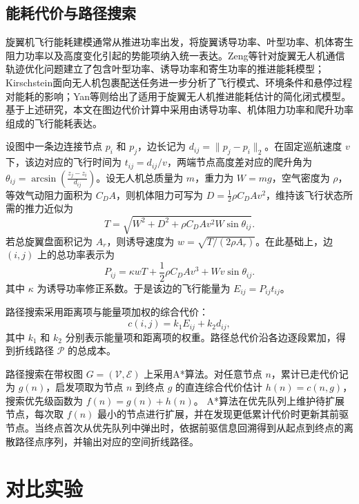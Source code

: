 \subsection{能耗代价与路径搜索}

旋翼机飞行能耗建模通常从推进功率出发，将旋翼诱导功率、叶型功率、机体寄生阻力功率以及高度变化引起的势能项纳入统一表达。Zeng等针对旋翼无人机通信轨迹优化问题建立了包含叶型功率、诱导功率和寄生功率的推进能耗模型\cite{zeng2019energy}；Kirschstein面向无人机包裹配送任务进一步分析了飞行模式、环境条件和悬停过程对能耗的影响\cite{kirschstein2020comparison}；Yan等则给出了适用于旋翼无人机推进能耗估计的简化闭式模型\cite{yan2021new}。基于上述研究，本文在图边代价计算中采用由诱导功率、机体阻力功率和爬升功率组成的飞行能耗表达。

设图中一条边连接节点 \(p_i\) 和 \(p_j\)，边长记为 \(d_{ij}=\|p_j-p_i\|_2\)。在固定巡航速度 \(v\) 下，该边对应的飞行时间为 \(t_{ij}=d_{ij}/v\)，两端节点高度差对应的爬升角为 \(\theta_{ij}=\arcsin\left(\frac{z_j-z_i}{d_{ij}}\right)\)。设无人机总质量为 \(m\)，重力为 \(W=mg\)，空气密度为 \(\rho\)，等效气动阻力面积为 \(C_DA\)，则机体阻力可写为 \(D=\frac{1}{2}\rho C_DA v^2\)，维持该飞行状态所需的推力近似为
\[
T=\sqrt{W^2+D^2+\rho C_DA v^2W\sin\theta_{ij}}.
\]
若总旋翼盘面积记为 \(A_r\)，则诱导速度为 \(w=\sqrt{T/(2\rho A_r)}\)。在此基础上，边 \((i,j)\) 上的总功率表示为
\begin{equation}
P_{ij} = \kappa wT + \frac{1}{2}\rho C_DA v^3 + Wv\sin\theta_{ij}.
\label{eq:2_3}
\end{equation}
其中 \(\kappa\) 为诱导功率修正系数。于是该边的飞行能量为 \(E_{ij}=P_{ij}t_{ij}\)。

路径搜索采用距离项与能量项加权的综合代价：
\begin{equation}
c(i,j) = k_1E_{ij} + k_2d_{ij},
\label{eq:2_4}
\end{equation}
其中 \(k_1\) 和 \(k_2\) 分别表示能量项和距离项的权重。路径总代价沿各边逐段累加，得到折线路径 \(\mathcal P\) 的总成本。

路径搜索在带权图 \(G=(\mathcal V,\mathcal E)\) 上采用A*算法。对任意节点 \(n\)，累计已走代价记为 \(g(n)\)，启发项取为节点 \(n\) 到终点 \(g\) 的直连综合代价估计 \(h(n)=c(n,g)\)，搜索优先级函数为 \(f(n)=g(n)+h(n)\)。
A*算法在优先队列上维护待扩展节点，每次取 \(f(n)\) 最小的节点进行扩展，并在发现更低累计代价时更新其前驱节点。当终点首次从优先队列中弹出时，依据前驱信息回溯得到从起点到终点的离散路径点序列，并输出对应的空间折线路径。

\section{对比实验}

